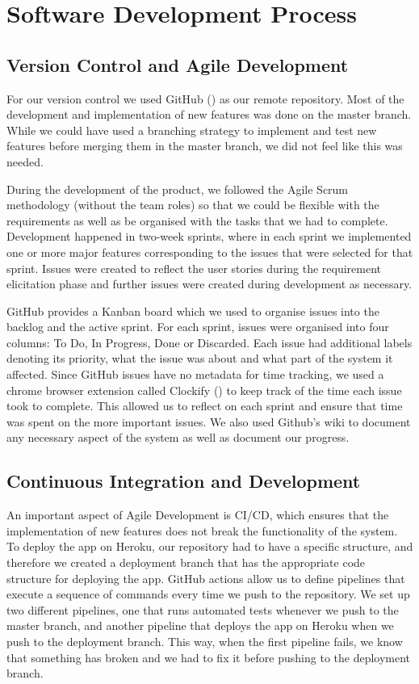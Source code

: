 \documentclass{l4proj}
\begin{document}
\section{Software Development Process}

\subsection{Version Control and Agile Development}
For our version control we used GitHub (\cite{github}) as our remote repository. Most of the development and implementation of new features was done on the master branch. While we could have used a branching strategy to implement and test new features before merging them in the master branch, we did not feel like this was needed.

During the development of the product, we followed the Agile Scrum methodology (without the team roles) so that we could be flexible with the requirements as well as be organised with the tasks that we had to complete. Development happened in two-week sprints, where in each sprint we implemented one or more major features corresponding to the issues that were selected for that sprint. Issues were created to reflect the user stories during the requirement elicitation phase and further issues were created during development as necessary. 

GitHub provides a Kanban board which we used to organise issues into the backlog and the active sprint. For each sprint, issues were organised into four columns: To Do, In Progress, Done or Discarded. Each issue had additional labels denoting its priority, what the issue was about and what part of the system it affected. Since GitHub issues have no metadata for time tracking, we used a chrome browser extension called Clockify (\cite{clock}) to keep track of the time each issue took to complete. This allowed us to reflect on each sprint and ensure that time was spent on the more important issues. We also used Github's wiki to document any necessary aspect of the system as well as document our progress.

\subsection{Continuous Integration and Development}
An important aspect of Agile Development is CI/CD, which ensures that the implementation of new features does not break the functionality of the system. To deploy the app on Heroku, our repository had to have a specific structure, and therefore we created a deployment branch that has the appropriate code structure for deploying the app. GitHub actions allow us to define pipelines that execute a sequence of commands every time we push to the repository. We set up two different pipelines, one that runs automated tests whenever we push to the master branch, and another pipeline that deploys the app on Heroku when we push to the deployment branch. This way, when the first pipeline fails, we know that something has broken and we had to fix it before pushing to the deployment branch.
\end{document}
